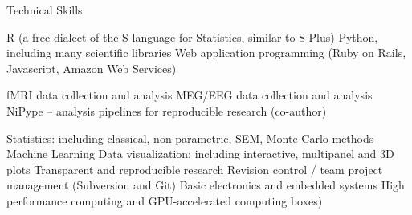 \begin{rubric}{Technical Skills}

\entry* R (a free dialect of the S language for Statistics, similar to S-Plus)
\entry* Python, including many scientific libraries
\entry* Web application programming (Ruby on Rails, Javascript, Amazon Web
Services)

\entry* fMRI data collection and analysis
\entry* MEG/EEG data collection and analysis
\entry* NiPype -- analysis pipelines for reproducible research (co-author)

\entry* Statistics: including classical, non-parametric, SEM, Monte Carlo methods
\entry* Machine Learning
\entry* Data visualization: including interactive, multipanel and 3D plots
\entry* Transparent and reproducible research
\entry* Revision control / team project management (Subversion and Git)
\entry* Basic electronics and embedded systems
\entry* High performance computing and GPU-accelerated computing
boxes)

\end{rubric}
